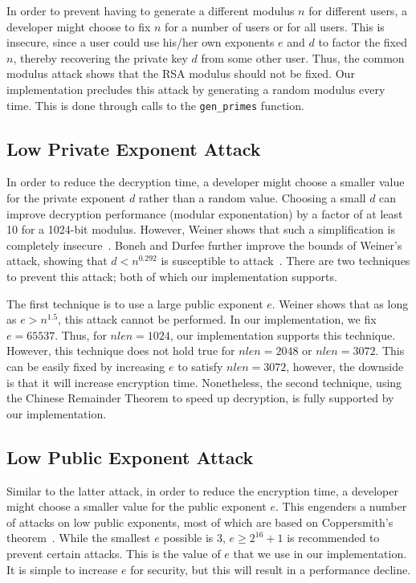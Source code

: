 \documentclass[a4paper]{article}
\begin{document}
In order to prevent having to generate a different modulus $n$ for different users, a developer might choose to fix $n$ for a number of users or for all users. This is insecure, since a user could use his/her own exponents $e$ and $d$ to factor the fixed $n$, thereby recovering the private key $d$ from some other user. Thus, the common modulus attack shows that the RSA modulus should not be fixed. Our implementation precludes this attack by generating a random modulus every time.
This is done through calls to the {\tt gen\_primes} function.

\subsection{Low Private Exponent Attack}
In order to reduce the decryption time, a developer might choose a smaller value for the private exponent $d$ rather than a random value. Choosing a small $d$ can improve decryption performance (modular exponentation) by a factor of at least 10 for a 1024-bit modulus. However, Weiner shows that such a simplification is completely insecure~\cite{wiener1990cryptanalysis}. Boneh and Durfee further improve the bounds of Weiner's attack, showing that $d <
n^{0.292}$ is susceptible to attack~\cite{boneh2000new}. There are two techniques to prevent this attack; both of which our implementation supports. 

The first technique is to use a large public exponent $e$. Weiner shows that as long as $e > n^{1.5}$, this attack cannot be performed. In our implementation, we fix $e = 65537$. Thus, for $nlen = 1024$, our implementation supports this technique. However, this technique does not hold true for $nlen = 2048$ or $nlen = 3072$. This can be easily fixed by increasing $e$ to satisfy $nlen = 3072$, however, the downside is that it will increase encryption time. Nonetheless, the second technique, using
the Chinese Remainder Theorem to speed up decryption, is fully supported by our implementation.

\subsection{Low Public Exponent Attack}

Similar to the latter attack, in order to reduce the encryption time, a developer might choose a smaller value for the public exponent $e$. This engenders a number of attacks on low public exponents, most of which are based on Coppersmith's theorem~\cite{coppersmith1997small}. While the smallest $e$ possible is 3, $e \geq 2^{16} + 1$ is recommended to prevent certain attacks. This is the value of $e$ that we use in our implementation. It is simple to increase $e$ for security, but this will result in a performance decline.
\end{document}
